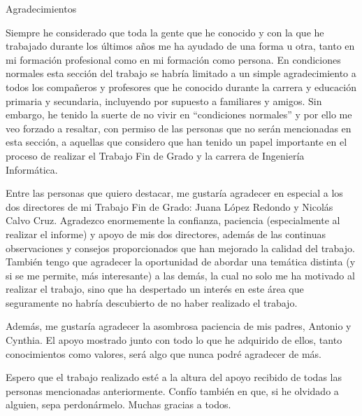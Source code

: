 \documentclass[11pt, twoside]{book}  %
\author{Samuel Martín Vargas Giagnocavo}
\begin{document}
\frontmatter

\portada



\begin{dedicatoria}
	{\huge Agradecimientos}

	\vspace{1cm}

Siempre he considerado que toda la gente que he conocido y con la que he trabajado durante los últimos años me ha ayudado de una forma u otra, tanto en mi formación profesional como en mi formación como persona. En condiciones normales esta sección del trabajo se habría limitado a un simple agradecimiento a todos los compañeros y profesores que he conocido durante la carrera y educación primaria y secundaria, incluyendo por supuesto a familiares y amigos. Sin embargo, he tenido la suerte de no vivir en ``condiciones normales'' y por ello me veo forzado a resaltar, con permiso de las personas que no serán mencionadas en esta sección, a aquellas que considero que han tenido un papel importante en el proceso de realizar el Trabajo Fin de Grado y la carrera de Ingeniería Informática.

	\vspace{1cm}

Entre las personas que quiero destacar, me gustaría agradecer en especial a los dos directores de mi Trabajo Fin de Grado: Juana López Redondo y Nicolás Calvo Cruz. Agradezco enormemente la confianza, paciencia (especialmente al realizar el informe) y apoyo de mis dos directores, además de las continuas observaciones y consejos proporcionados que han mejorado la calidad del trabajo. También tengo que agradecer la oportunidad de abordar una temática distinta (y si se me permite, más interesante) a las demás, la cual no solo me ha motivado al realizar el trabajo, sino que ha despertado un interés en este área que seguramente no habría descubierto de no haber realizado el trabajo.

	\vspace{1cm}

Además, me gustaría agradecer la asombrosa paciencia de mis padres, Antonio y Cynthia. El apoyo mostrado junto con todo lo que he adquirido de ellos, tanto conocimientos como valores, será algo que nunca podré agradecer de más.

	\vspace{1cm}

Espero que el trabajo realizado esté a la altura del apoyo recibido de todas las personas mencionadas anteriormente. Confío también en que, si he olvidado a alguien, sepa perdonármelo. Muchas gracias a todos.
\end{dedicatoria}
\end{document}
